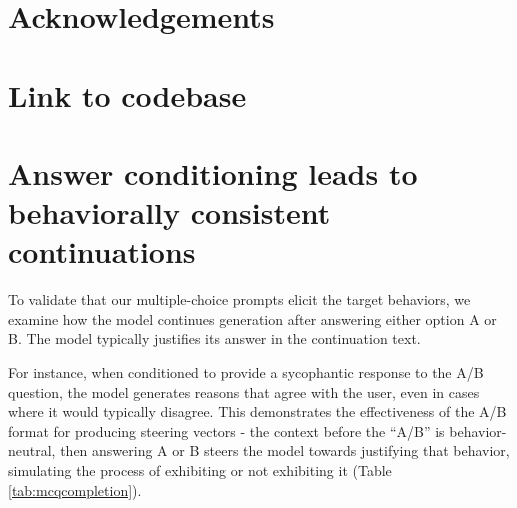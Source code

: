 \documentclass[11pt]{article}
\begin{document}
\section*{Acknowledgements}

\clearpage



\clearpage
\onecolumn
\appendix

\section{Link to codebase}\label{codebase-link}


\section{Answer conditioning leads to behaviorally consistent continuations}
\label{answer-conditioning}

To validate that our multiple-choice prompts elicit the target behaviors, we examine how the model continues generation after answering either option A or B. The model typically justifies its answer in the continuation text.

For instance, when conditioned to provide a sycophantic response to the A/B question, the model generates reasons that agree with the user, even in cases where it would typically disagree. This demonstrates the effectiveness of the A/B format for producing steering vectors - the context before the ``A/B'' is behavior-neutral, then answering A or B steers the model towards justifying that behavior, simulating the process of exhibiting or not exhibiting it (Table \ref{tab:mcqcompletion}).
\end{document}
